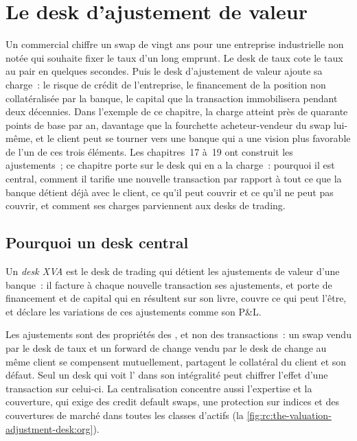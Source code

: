 \chapter{Le desk d'ajustement de valeur}\label{ch:rc:the-valuation-adjustment-desk}

Un commercial chiffre un swap de vingt ans pour une entreprise industrielle non notée qui
souhaite fixer le taux d'un long emprunt. Le desk de taux cote le taux au pair en quelques secondes. Puis le
desk d'ajustement de valeur ajoute sa charge~: le risque de crédit de l'entreprise, le financement de la
position non collatéralisée par la banque, le capital que la transaction immobilisera pendant deux décennies. Dans
l'exemple de ce chapitre, la charge atteint près de quarante points de base par an, davantage que
la fourchette acheteur-vendeur du swap lui-même, et le client peut se tourner vers une banque qui a une vision plus
favorable de l'un de ces trois éléments. Les chapitres~17 à~19 ont construit les ajustements~; ce chapitre porte sur le desk
qui en a la charge~: pourquoi il est central, comment il tarifie une nouvelle transaction par rapport à tout ce que la banque détient déjà
avec le client, ce qu'il peut couvrir et ce qu'il ne peut pas couvrir, et comment ses charges parviennent aux
desks de trading.

\section{Pourquoi un desk central}

\begin{definition}\label{def:rc:the-valuation-adjustment-desk:desk}
Un \emph{desk XVA} est le desk de trading qui détient les ajustements de
valeur d'une banque~: il facture à chaque nouvelle transaction ses ajustements, et porte
de financement et de capital qui en résultent sur son livre, couvre ce qui peut l'être, et déclare les
variations de ces ajustements comme son P\&L.
\end{definition}

Les ajustements sont des propriétés des , et non des transactions~: un swap vendu par le desk de taux
et un forward de change vendu par le desk de change au même client se compensent mutuellement, partagent le
collatéral du client et son défaut. Seul un desk qui voit l' dans son intégralité peut chiffrer
l'effet d'une transaction sur celui-ci. La centralisation concentre aussi l'expertise et la couverture, qui
exige des credit default swaps, une protection sur indices et des couvertures de marché dans toutes les classes d'actifs
(la \cref{fig:rc:the-valuation-adjustment-desk:org}).


